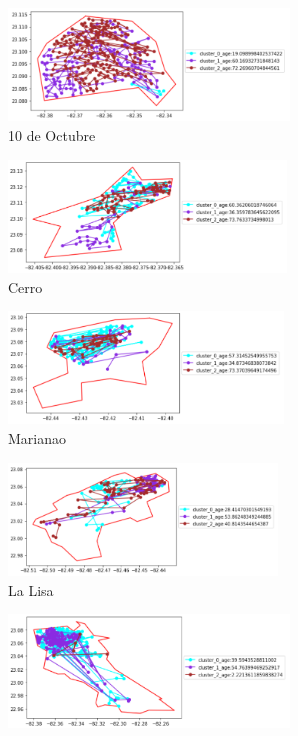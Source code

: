 \begin{figure}[h!]
	\centering
	\begin{subfigure}[b]{0.49\linewidth}
		\includegraphics[width=\linewidth, height=3cm]{Images/10Otc.png}
		\caption{10 de Octubre}
		\label{fig:10Oct}
	\end{subfigure}
	\begin{subfigure}[b]{0.49\linewidth}
		\includegraphics[width=\linewidth, height=3cm]{Images/Cerro.png}
		\caption{Cerro}
		\label{fig:Cerro}
	\end{subfigure}
	\begin{subfigure}[b]{0.49\linewidth}
		\includegraphics[width=\linewidth, height=3cm]{Images/Marianao.png}
		\caption{Marianao}
		\label{fig:Marianao}
	\end{subfigure}
	\begin{subfigure}[b]{0.49\linewidth}
		\includegraphics[width=\linewidth, height=3cm]{Images/LaLisa.png}
		\caption{La Lisa}
		\label{fig:Lisa}
	\end{subfigure}
	\begin{subfigure}[b]{0.49\linewidth}
		\includegraphics[width=\linewidth, height=3cm]{Images/ArroyoN.png}

\end{subfigure}
\end{figure}
